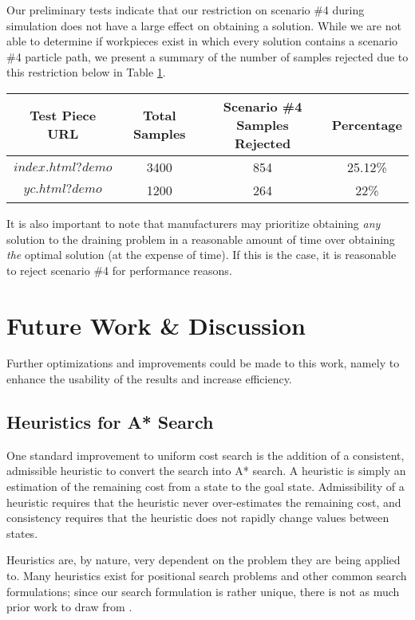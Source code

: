 Our preliminary tests indicate that our restriction on scenario \#4 during simulation does not have a large effect on obtaining a solution. While we are not able to determine if workpieces exist in which every solution contains a scenario \#4 particle path, we present a summary of the number of samples rejected due to this restriction below in Table \ref{scenario4rejects}.

\begin{table}[H]\label{scenario4rejects}
\centering
\def\arraystretch{1.2}
\begin{tabular}{|c|c|c|c|}
\hline
Test Piece URL & Total Samples & Scenario \#4 Samples Rejected & Percentage \\ \hline
$index.html?demo$ & 3400 & 854 & 25.12\%\\
$yc.html?demo$ & 1200 & 264 & 22\% \\ \hline
\end{tabular}
\end{table}

It is also important to note that manufacturers may prioritize obtaining \emph{any} solution to the draining problem in a reasonable amount of time over obtaining \emph{the} optimal solution (at the expense of time). If this is the case, it is reasonable to reject scenario \#4 for performance reasons.

\section{Future Work \& Discussion}

Further optimizations and improvements could be made to this work, namely to enhance the usability of the results and increase efficiency.

  \subsection{Heuristics for A* Search}

One standard improvement to uniform cost search is the addition of a consistent, admissible heuristic to convert the search into A* search. A heuristic is simply an estimation of the remaining cost from a state to the goal state. Admissibility of a heuristic requires that the heuristic never over-estimates the remaining cost, and consistency requires that the heuristic does not rapidly change values between states.

Heuristics are, by nature, very dependent on the problem they are being applied to. Many heuristics exist for positional search problems and other common search formulations; since our search formulation is rather unique, there is not as much prior work to draw from \cite{heuristics}.

